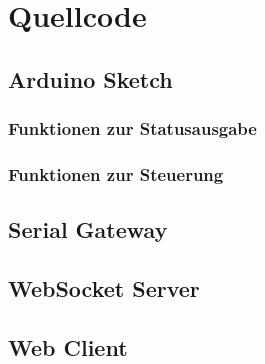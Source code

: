 \appendix{}
\section{Quellcode}
\subsection{Arduino Sketch} \label{Arduino Sketch}

\subsubsection{Funktionen zur Statusausgabe}

\subsubsection{Funktionen zur Steuerung}


\newpage
\subsection{Serial Gateway} \label{Serial Gateway}


\newpage
\subsection{WebSocket Server} \label{WebSocket Server}


\newpage
\subsection{Web Client} \label{Web Client}
